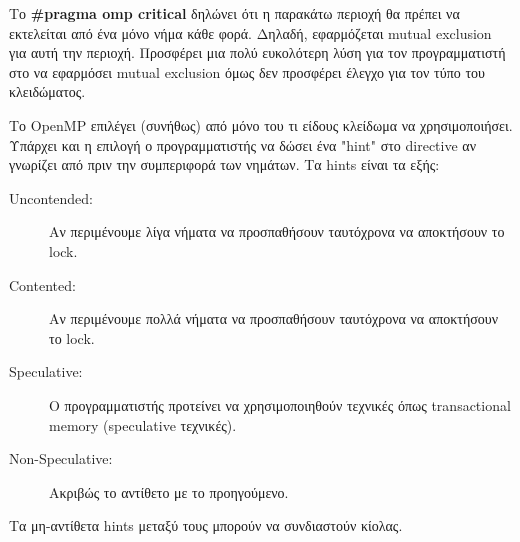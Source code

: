 \documentclass[../final_report.tex]{subfiles}
\begin{document}
Το \textbf{\#pragma omp critical} δηλώνει ότι η παρακάτω περιοχή θα πρέπει να εκτελείται από ένα μόνο νήμα κάθε φορά. Δηλαδή,
εφαρμόζεται mutual exclusion για αυτή την περιοχή. Προσφέρει μια πολύ ευκολότερη λύση για τον προγραμματιστή στο να εφαρμόσει
mutual exclusion όμως δεν προσφέρει έλεγχο για τον τύπο του κλειδώματος.

Το OpenMP επιλέγει (συνήθως) από μόνο του τι είδους κλείδωμα να χρησιμοποιήσει. Υπάρχει και η επιλογή ο προγραμματιστής
να δώσει ένα "hint" στο directive αν γνωρίζει από πριν την συμπεριφορά των νημάτων. Τα hints είναι τα εξής:

\begin{description}
    \item [Uncontended:] Αν περιμένουμε λίγα νήματα να προσπαθήσουν ταυτόχρονα να αποκτήσουν το lock.
    \item [Contented:] Αν περιμένουμε πολλά νήματα να προσπαθήσουν ταυτόχρονα να αποκτήσουν το lock.
    \item [Speculative:] Ο προγραμματιστής προτείνει να χρησιμοποιηθούν τεχνικές όπως transactional memory (speculative τεχνικές).
    \item [Non-Speculative:] Ακριβώς το αντίθετο με το προηγούμενο.
\end{description}

Τα μη-αντίθετα hints μεταξύ τους μπορούν να συνδιαστούν κίολας.
\end{document}
